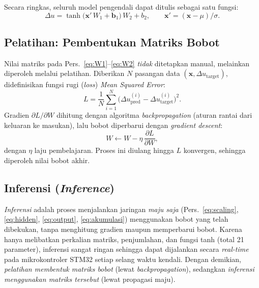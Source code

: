 Secara ringkas, seluruh model pengendali dapat ditulis sebagai satu fungsi:
\begin{equation}
\Delta u = \tanh\!\big(\mathbf{x'}\,W_1 + \mathbf{b}_1\big)\,W_2 + b_2,
\qquad \mathbf{x'} = (\mathbf{x}-\mu)/\sigma .
\label{eq:model-ringkas}
\end{equation}

\subsection{Pelatihan: Pembentukan Matriks Bobot}
\label{sub:pelatihan}
Nilai matriks pada Pers.~\eqref{eq:W1}--\eqref{eq:W2} \emph{tidak} ditetapkan manual,
melainkan diperoleh melalui pelatihan. Diberikan $N$ pasangan data
$(\mathbf{x}, \Delta u_{\text{target}})$, didefinisikan fungsi rugi (\emph{loss})
\emph{Mean Squared Error}:
\begin{equation}
L = \frac{1}{N}\sum_{i=1}^{N}\big(\Delta u^{(i)}_{\text{pred}} - \Delta u^{(i)}_{\text{target}}\big)^{2}.
\label{eq:loss}
\end{equation}
Gradien $\partial L/\partial W$ dihitung dengan algoritma \emph{backpropagation}
(aturan rantai dari keluaran ke masukan), lalu bobot diperbarui dengan
\emph{gradient descent}:
\begin{equation}
W \leftarrow W - \eta\,\frac{\partial L}{\partial W},
\label{eq:gd}
\end{equation}
dengan $\eta$ laju pembelajaran. Proses ini diulang hingga $L$ konvergen, sehingga
diperoleh nilai bobot akhir.

\subsection{Inferensi (\emph{Inference})}
\label{sub:inferensi}
\emph{Inferensi} adalah proses menjalankan jaringan \emph{maju saja}
(Pers.~\eqref{eq:scaling}, \eqref{eq:hidden}, \eqref{eq:output}, \eqref{eq:akumulasi})
menggunakan bobot yang telah dibekukan, tanpa menghitung gradien maupun memperbarui
bobot. Karena hanya melibatkan perkalian matriks, penjumlahan, dan fungsi tanh
(total 21 parameter), inferensi sangat ringan sehingga dapat dijalankan secara
\emph{real-time} pada mikrokontroler STM32 setiap selang waktu kendali. Dengan
demikian, \emph{pelatihan membentuk matriks bobot} (lewat \emph{backpropagation}),
sedangkan \emph{inferensi menggunakan matriks tersebut} (lewat propagasi maju).

